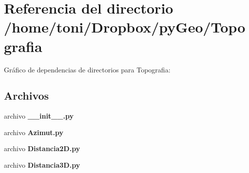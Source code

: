 \section{Referencia del directorio /home/toni/\-Dropbox/py\-Geo/\-Topografia}
\label{dir_15251017b11e736d85864dfcc810f037}
Gráfico de dependencias de directorios para Topografia\-:
\subsection*{Archivos}
\begin{DoxyCompactItemize}
\item 
archivo {\bf \-\_\-\-\_\-init\-\_\-\-\_\-.\-py}
\item 
archivo {\bf Azimut.\-py}
\item 
archivo {\bf Distancia2\-D.\-py}
\item 
archivo {\bf Distancia3\-D.\-py}
\end{DoxyCompactItemize}
